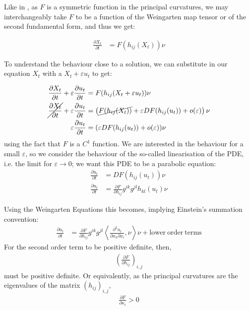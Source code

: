 Like in \cite{huisken}, as $F$ is a symmetric function in the principal curvatures, we may interchangeably take $F$ to be a function of the Weingarten map tensor or of the second fundamental form, and thus we get:

\begin{align*}
	\frac{\partial X_t}{\partial t} &= F(h_{ij}(X_t)) \nu
\end{align*}

To understand the behaviour close to a solution, we can substitute in our equation $X_t$ with a $X_t+\varepsilon u_t$ to get:

\begin{align*}
		\frac{\partial X_t}{\partial t} + \varepsilon\frac{\partial u_t}{\partial t}  &= F(h_{ij}(X_t+\varepsilon u_t)) \nu\\
		\cancel{\frac{\partial X_t}{\partial t}} + \varepsilon\frac{\partial u_t}{\partial t}  &= \left(\cancel{F(h_{ij}(X_t))} + \varepsilon DF( h_{ij}(u_t)) +o(\varepsilon)\right) \nu \\
		\varepsilon\frac{\partial u_t}{\partial t}  &= (\varepsilon DF( h_{ij}(u_t)) +o(\varepsilon)) \nu
\end{align*}
using the fact that $F$ is a $C^1$ function. 
We are interested in the behaviour for a small $\varepsilon$, so we consider the behaviour of the so-called linearisation of the PDE, i.e. the limit for $\varepsilon \rightarrow 0$; we want this PDE to be a parabolic equation:
\begin{align*}
	\frac{\partial u_t}{\partial t}  &=  DF(h_{ij}(u_t)) \nu\\
	\frac{\partial u_t}{\partial t} &= \frac{\partial F}{\partial h_{i j}} g^{i k}g^{jl}h_{k l}(u_t) \nu
\end{align*}

Using the Weingarten Equations this becomes, implying Einstein's summation convention: 
\begin{align*}
	\frac{\partial u_t}{\partial t} &= \frac{\partial F}{\partial h_{i j}} g^{i k}g^{jl}\left\langle \frac{\partial^2 u_t}{\partial x_k\partial x_l} , \nu \right\rangle \nu+ \mathrm{lower \ order \ terms}
\end{align*}
For the second order term to be positive definite, then, 
\begin{align*}
		\left(\frac{\partial F}{\partial h_{i j}} \right)_{i, j}
\end{align*}
must be positive definite. Or equivalently, as the principal curvatures are the eigenvalues of the matrix $(h_{i j})_{i, j}$,
\begin{align*}
	\frac{\partial F}{\partial \kappa_{i}} > 0
\end{align*}

